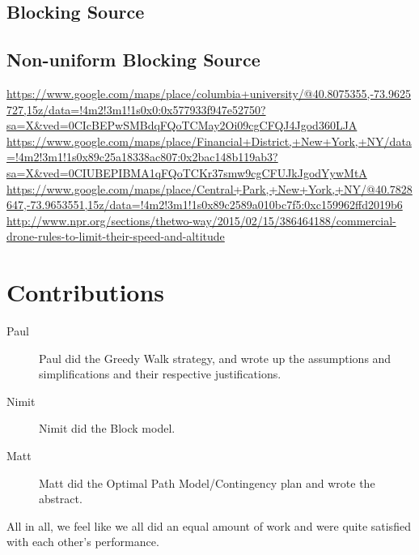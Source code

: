 \documentclass{article}
\begin{document}
\subsection{Blocking Source}
\label{sub:blocking_source}



\subsection{Non-uniform Blocking Source}
\label{sub:fk}






\begin{thebibliography}{9}
    \url{https://www.google.com/maps/place/columbia+university/@40.8075355,-73.9625727,15z/data=!4m2!3m1!1s0x0:0x577933f947e52750?sa=X&ved=0CIcBEPwSMBdqFQoTCMay2Oi09cgCFQJ4Jgod360LJA}
    \url{https://www.google.com/maps/place/Financial+District,+New+York,+NY/data=!4m2!3m1!1s0x89c25a18338ac807:0x2bac148b119ab3?sa=X&ved=0CIUBEPIBMA1qFQoTCKr37smw9cgCFUJkJgodYywMtA}
    \url{https://www.google.com/maps/place/Central+Park,+New+York,+NY/@40.7828647,-73.9653551,15z/data=!4m2!3m1!1s0x89c2589a010bc7f5:0xc159962ffd2019b6}
    \url{http://www.npr.org/sections/thetwo-way/2015/02/15/386464188/commercial-drone-rules-to-limit-their-speed-and-altitude}
\end{thebibliography}

\section{Contributions}
\label{sec:contributions}
\begin{description}
  \item[Paul] Paul did the Greedy Walk strategy, and wrote up the assumptions and simplifications and their respective justifications.
  \item[Nimit] Nimit did the Block model.
  \item[Matt] Matt did the Optimal Path Model/Contingency plan and wrote the abstract.
\end{description}
All in all, we feel like we all did an equal amount of work and were quite satisfied with each other's performance.
\end{document}
